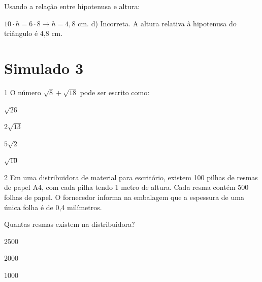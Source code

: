 \begin{escolha}
\begin{escolha}
\begin{escolha}
\begin{escolha}
{\begin{boxmedio}
\begin{boxpeq}
\begin{q°}
\begin{boxmedio}
\begin{boxpeq}
\begin{boxpeq}
\begin{boxmedio}
\begin{boxmedio}
\begin{boxmedio}
\begin{largebox}
\begin{boxmedio}
{\begin{escolha}
\begin{escolha}
\begin{escolha}
\begin{escolha}
\begin{escolha}
\begin{escolha}
{Usando a relação entre hipotenusa e altura: 

$10 \cdot h = 6 \cdot 8 \rightarrow h = 4,8$ cm.
d) Incorreta. A altura relativa à hipotenusa do triângulo é 4,8 cm.}

\chapter{Simulado 3}

\num{1} O número $\sqrt{8} + \sqrt{18}$ pode ser escrito como:

\begin{escolha}

  \item $\sqrt{26}$
  \item $2\sqrt{13}$
  \item $5\sqrt{2}$
  \item $\sqrt{10}$

\end{escolha}


\num{2} Em uma distribuidora de material para escritório, existem 100 
pilhas de resmas de papel A4, com cada pilha tendo 1 metro de altura. Cada 
resma contém 500 folhas de papel. O fornecedor informa na embalagem que a 
espessura de uma única folha é de 0,4 milímetros.

Quantas resmas existem na distribuidora?

\begin{escolha}

\item 2500

\item 2000

\item 1000


\end{escolha}
\end{escolha}
\end{escolha}
\end{escolha}
\end{escolha}
\end{escolha}
\end{escolha}}
\end{boxmedio}
\end{largebox}
\end{boxmedio}
\end{boxmedio}
\end{boxmedio}
\end{boxpeq}
\end{boxpeq}
\end{boxmedio}
\end{q°}
\end{boxpeq}
\end{boxmedio}}
\end{escolha}
\end{escolha}
\end{escolha}
\end{escolha}
